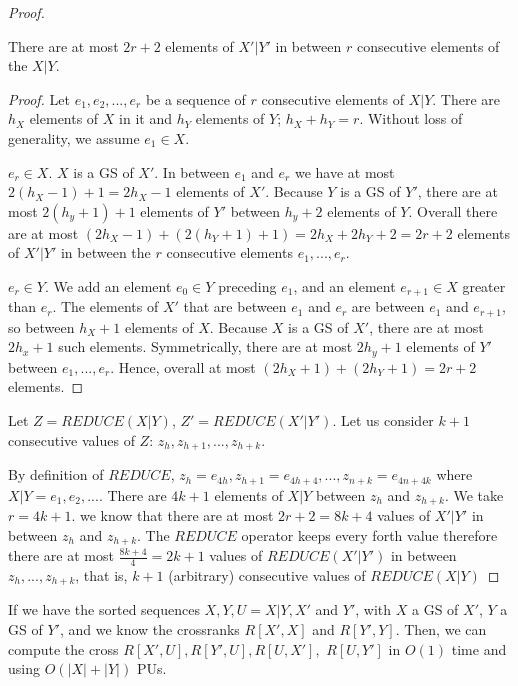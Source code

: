 \begin{proof}

\begin{prop}
There are at most $2r+2$ elements of $X'|Y'$ in between $r$ consecutive elements of the $X|Y$.
\end{prop}


\begin{proof}
Let $e_1, e_2, ..., e_r$ be a sequence of $r$ consecutive elements of $X|Y$. There are $h_X$ elements of $X$ in it and $h_Y$ elements of $Y$; $h_X+h_Y=r$.
Without loss of generality, we assume $e_1\in X$.

 $e_r\in X$.
$X$ is a GS of $X'$. In between $e_1$ and $e_r$ we have at most $2(h_X-1)+1=2h_X-1$ elements of $X'$.
Because $Y$ is a GS of $Y'$, there are at most $2(h_y+1)+1$ elements of $Y'$ between $h_y+2$ elements of $Y$. Overall there are at most $(2h_X-1)+(2(h_Y+1)+1)=2h_X+2h_Y+2=2r+2$ elements of $X'|Y'$ in between the $r$ consecutive elements $e_1,...,e_r$.


 $e_r\in Y$.
We add an element $e_0\in Y$ preceding $e_1$, and an element $e_{r+1}\in X$ greater than $e_r$. The elements of $X'$ that are between $e_1$ and $e_r$ are between $e_1$ and $e_{r+1}$, so between $h_X+1$ elements of $X$. Because $X$ is a GS of $X'$, there are at most $2h_x+1$ such elements. Symmetrically, there are at most $2h_y + 1$ elements of $Y'$ between $e_1,...,e_r$. Hence, overall at most $(2h_X+1)+(2h_Y+1)=2r+2$ elements.
\end{proof}


Let $Z=REDUCE(X|Y)$, $Z'=REDUCE(X'|Y')$. Let us consider $k+1$ consecutive values of $Z$: $z_h, z_{h+1},...,z_{h+k}$.

By definition of $REDUCE$, $z_h=e_{4h}, z_{h+1}=e_{4h+4},...,z_{n+k}=e_{4n+4k}$ where $X|Y=e_1,e_2,...$.
There are $4k+1$ elements of $X|Y$ between $z_h$ and $z_{h+k}$. We take $r=4k+1$. we know that there are at most $2r+2=8k+4$ values of $X'|Y'$ in between $z_h$ and $z_{h+k}$. The $REDUCE$ operator keeps every forth value therefore there are at most $\frac{8k+4}{4}=2k+1$ values of $REDUCE(X'|Y')$ in between $z_h,...,z_{h+k}$, that is, $k+1$ (arbitrary) consecutive values of $REDUCE(X|Y)$
\end{proof}


\begin{lemma}
If we have the sorted sequences $X,Y,U=X|Y,X'$ and $Y'$, with $X$ a GS of $X'$, $Y$ a GS of $Y'$, and we know the crossranks $R[X',X]$ and $R[Y',Y]$. Then, we can compute the cross $R[X',U],R[Y',U],R[U,X'],$ $R[U,Y']$ in $O(1)$ time and using $O(|X|+|Y|)$ PUs.
\end{lemma}
